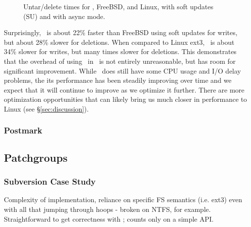 \begin{figure}[htb]
\caption{\label{fig:macro} Untar/delete times for \Kudos, FreeBSD, and Linux,
with soft updates (SU) and with async mode.}
\end{figure}

Surprisingly, \Kudos\ is about 22\% faster than FreeBSD using soft updates for
writes, but about 28\% slower for deletions.
%
When compared to Linux ext3, \Kudos\ is about 34\% slower for writes, but many
times slower for deletions.
%
This demonstrates that the overhead of using \chdescs\ in \Kudos\ is not
entirely unreasonable, but has room for significant improvement.
%
While \Kudos\ does still have some CPU usage and I/O delay problems, the its
performance has been steadily improving over time and we expect that it will
continue to improve as we optimize it further.
%
There are more optimization opportunities that can likely bring us much closer
in performance to Linux (see \S\ref{sec:discussion}).

\subsubsection {Postmark}

\subsection {Patchgroups}

\subsubsection {Subversion Case Study}

Complexity of implementation, reliance on specific FS semantics (i.e. ext3)
even with all that jumping through hoops - broken on NTFS, for example.
Straightforward to get correctness with \opgroups; counts only on a simple API.

